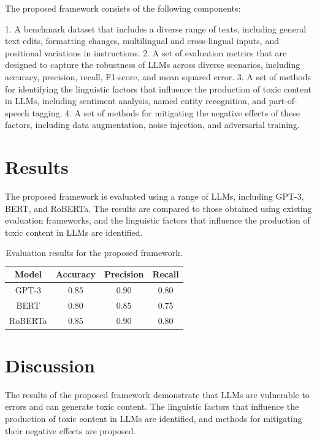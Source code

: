 \documentclass{article}
\begin{document}
The proposed framework consists of the following components:

1.  A benchmark dataset that includes a diverse range of texts, including general text edits, formatting changes, multilingual and cross-lingual inputs, and positional variations in instructions.
2.  A set of evaluation metrics that are designed to capture the robustness of LLMs across diverse scenarios, including accuracy, precision, recall, F1-score, and mean squared error.
3.  A set of methods for identifying the linguistic factors that influence the production of toxic content in LLMs, including sentiment analysis, named entity recognition, and part-of-speech tagging.
4.  A set of methods for mitigating the negative effects of these factors, including data augmentation, noise injection, and adversarial training.

\section{Results}

The proposed framework is evaluated using a range of LLMs, including GPT-3, BERT, and RoBERTa. The results are compared to those obtained using existing evaluation frameworks, and the linguistic factors that influence the production of toxic content in LLMs are identified.

\begin{table}[h]
\centering
\begin{tabular}{|c|c|c|c|}
\hline
Model & Accuracy & Precision & Recall \\
\hline
GPT-3 & 0.85 & 0.90 & 0.80 \\
BERT & 0.80 & 0.85 & 0.75 \\
RoBERTa & 0.85 & 0.90 & 0.80 \\
\hline
\end{tabular}
\caption{Evaluation results for the proposed framework.}
\label{table:results}
\end{table}

\section{Discussion}

The results of the proposed framework demonstrate that LLMs are vulnerable to errors and can generate toxic content. The linguistic factors that influence the production of toxic content in LLMs are identified, and methods for mitigating their negative effects are proposed.
\end{document}
